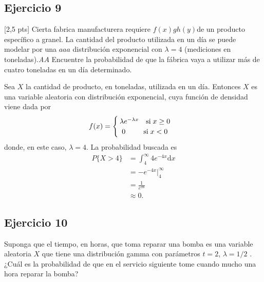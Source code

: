 \subsection*{Ejercicio 9}[2,5 pts]
	Cierta fabrica manufacturera requiere $f(x)gh(y)$de un producto específico a granel. La cantidad del producto utilizada
	en un día se puede modelar por una $aaa$ distribución exponencial con $\lambda = 4$ (mediciones en toneladas).\textit{A}$A$ Encuentre la
	probabilidad de que la fábrica vaya a utilizar más de cuatro toneladas en un día determinado.

\begin{sol}
	Sea $X$ la cantidad de producto, en toneladas, utilizada en un día. Entonces $X$ es una variable aleatoria con distribución exponencial, cuya función de densidad viene dada por
	\[ 
	f(x) = \begin{cases}
		   \hspace{.2em} \lambda e^{-\lambda x} \quad \text{si} \; x\geq 0 \\
		   \hspace{.5em} 0 \hspace{2.5em} \text{si} \; x<0
		   \end{cases}
	 \]
	 donde, en este caso, $\lambda = 4$.
	 La probabilidad buscada es
	 \begin{align*}
	 	P\{X>4\} &= \int_{4}^{\infty} 4e^{-4x} \mathrm{d}x \\
	 	&= -e^{-4x} \bigg\rvert_{4}^{\infty} \\
	 	&= \frac{1}{e^{16}} \\
	 	&\approx 0.
	 \end{align*}
\end{sol}
\subsection*{Ejercicio 10}
	Suponga que el tiempo, en horas, que toma reparar una bomba es una variable aleatoria $X$ que tiene una
	distribución gamma con parámetros $t = 2$, $\lambda = 1/2$ . ¿Cuál es la probabilidad de que en el servicio siguiente tome cuando mucho una hora reparar la bomba?


